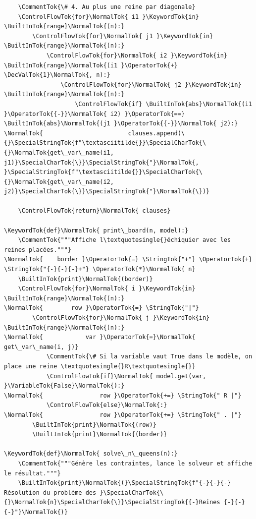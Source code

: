 \documentclass[11pt,a4paper]{article}
\begin{document}
\begin{lstlisting}
    \CommentTok{\# 4. Au plus une reine par diagonale}
    \ControlFlowTok{for}\NormalTok{ i1 }\KeywordTok{in} \BuiltInTok{range}\NormalTok{(n):}
        \ControlFlowTok{for}\NormalTok{ j1 }\KeywordTok{in} \BuiltInTok{range}\NormalTok{(n):}
            \ControlFlowTok{for}\NormalTok{ i2 }\KeywordTok{in} \BuiltInTok{range}\NormalTok{(i1 }\OperatorTok{+} \DecValTok{1}\NormalTok{, n):}
                \ControlFlowTok{for}\NormalTok{ j2 }\KeywordTok{in} \BuiltInTok{range}\NormalTok{(n):}
                    \ControlFlowTok{if} \BuiltInTok{abs}\NormalTok{(i1 }\OperatorTok{{-}}\NormalTok{ i2) }\OperatorTok{==} \BuiltInTok{abs}\NormalTok{(j1 }\OperatorTok{{-}}\NormalTok{ j2):}
\NormalTok{                        clauses.append(\{}\SpecialStringTok{f"\textasciitilde{}}\SpecialCharTok{\{}\NormalTok{get\_var\_name(i1, j1)}\SpecialCharTok{\}}\SpecialStringTok{"}\NormalTok{, }\SpecialStringTok{f"\textasciitilde{}}\SpecialCharTok{\{}\NormalTok{get\_var\_name(i2, j2)}\SpecialCharTok{\}}\SpecialStringTok{"}\NormalTok{\})}

    \ControlFlowTok{return}\NormalTok{ clauses}

\KeywordTok{def}\NormalTok{ print\_board(n, model):}
    \CommentTok{"""Affiche l\textquotesingle{}échiquier avec les reines placées."""}
\NormalTok{    border }\OperatorTok{=} \StringTok{"+"} \OperatorTok{+} \StringTok{"{-}{-}{-}+"} \OperatorTok{*}\NormalTok{ n}
    \BuiltInTok{print}\NormalTok{(border)}
    \ControlFlowTok{for}\NormalTok{ i }\KeywordTok{in} \BuiltInTok{range}\NormalTok{(n):}
\NormalTok{        row }\OperatorTok{=} \StringTok{"|"}
        \ControlFlowTok{for}\NormalTok{ j }\KeywordTok{in} \BuiltInTok{range}\NormalTok{(n):}
\NormalTok{            var }\OperatorTok{=}\NormalTok{ get\_var\_name(i, j)}
            \CommentTok{\# Si la variable vaut True dans le modèle, on place une reine \textquotesingle{}R\textquotesingle{}}
            \ControlFlowTok{if}\NormalTok{ model.get(var, }\VariableTok{False}\NormalTok{):}
\NormalTok{                row }\OperatorTok{+=} \StringTok{" R |"}
            \ControlFlowTok{else}\NormalTok{:}
\NormalTok{                row }\OperatorTok{+=} \StringTok{" . |"}
        \BuiltInTok{print}\NormalTok{(row)}
        \BuiltInTok{print}\NormalTok{(border)}

\KeywordTok{def}\NormalTok{ solve\_n\_queens(n):}
    \CommentTok{"""Génère les contraintes, lance le solveur et affiche le résultat."""}
    \BuiltInTok{print}\NormalTok{(}\SpecialStringTok{f"{-}{-}{-} Résolution du problème des }\SpecialCharTok{\{}\NormalTok{n}\SpecialCharTok{\}}\SpecialStringTok{{-}Reines {-}{-}{-}"}\NormalTok{)}


\end{lstlisting}
\end{document}
